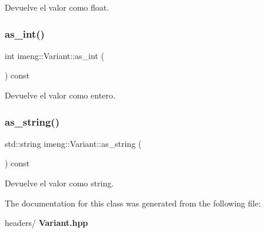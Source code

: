 Devuelve el valor como float. 

\mbox{\label{classimeng_1_1_variant_aaaa87687424056d80f72ec82fca39805}} 
\subsubsection{as\_int()}
{\footnotesize\ttfamily int imeng\+::\+Variant\+::as\+\_\+int (\begin{DoxyParamCaption}{ }\end{DoxyParamCaption}) const\hspace{0.3cm}{\ttfamily [inline]}}



Devuelve el valor como entero. 

\mbox{\label{classimeng_1_1_variant_a2bfd50a4ceac0a3bdba980ca6579de6e}} 
\subsubsection{as\_string()}
{\footnotesize\ttfamily std\+::string imeng\+::\+Variant\+::as\+\_\+string (\begin{DoxyParamCaption}{ }\end{DoxyParamCaption}) const\hspace{0.3cm}{\ttfamily [inline]}}



Devuelve el valor como string. 



The documentation for this class was generated from the following file\+:\begin{DoxyCompactItemize}
\item 
headers/\textbf{ Variant.\+hpp}\end{DoxyCompactItemize}
